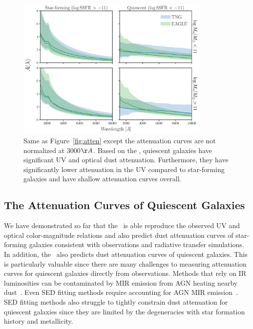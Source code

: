 \begin{figure}
\begin{center}
    \includegraphics[width=0.85\textwidth]{figs/abc_attenuation_unormalized.pdf}
    \caption{\label{fig:raw_atten}
    Same as Figure~\ref{fig:atten} except the attenuation curves are not
    normalized at 3000$\AA$. Based on the \eda, quiescent galaxies have
    significant UV and optical dust attenuation. Furthermore, they have 
    significantly lower attenuation in the UV compared to star-forming 
    galaxies and have shallow attenuation curves overall.
    }
\end{center}
\end{figure}
\subsection{The Attenuation Curves of Quiescent Galaxies}  
We have demonstrated so far that the \eda~is able reproduce the observed UV and
optical color-magnitude relations and also predict dust attenuation curves
of star-forming galaxies consistent with observations and radiative transfer 
simulations. In addition, the \eda~also predicts dust attenuation curves of
quiescent galaxies. This is particularly valuable since there are many challenges 
to measuring attenuation curves for quiescent galaxies directly from observations. 
Methods that rely on IR luminosities can be contaminated by MIR emission from AGN
heating nearby dust~\cite{kirkpatrick2015}. Even SED fitting methods require 
accounting for AGN MIR emission~\citep{salim2016, leja2018, salim2018}. SED 
fitting methods also struggle to tightly constrain dust attenuation for quiescent 
galaxies since they are limited by the degeneracies with star formation history and 
metallicity.

